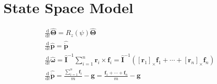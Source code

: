 \documentclass{article}
\begin{document}
\section{State Space Model}
$$
\begin{aligned}
    &\frac{\mathrm d}{\mathrm d t} \hat{\mathbf\Theta}=R_{z}(\psi) \hat{\mathbf\Theta} \\
    &\frac{\mathrm d}{\mathrm d t} \hat{\mathbf p}=\hat{\dot{\mathbf p}} \\
    &\frac{\mathrm d}{\mathrm d t} \hat{\mathbf \omega}=\hat{\mathbf I}^{-1} \sum_{i=1}^{n} \mathbf r_{i} \times \mathbf f_{i}=\hat{\mathbf I}^{-1}\left(\left[\mathbf r_{1}\right]_{\times} \mathbf f_{1}+\cdots+\left[\mathbf r_{n}\right]_{\times} \mathbf f_{n}\right) \\
    &\frac{\mathrm d}{\mathrm d t} \hat{\dot{\mathbf p}}=\frac{\sum_{i=1}^{n} \mathbf f_{i}}{m}-\mathbf g=\frac{\mathbf f_{1}+\cdots+\mathbf f_{n}}{m}-\mathbf g
\end{aligned}
$$
\\
\end{document}
